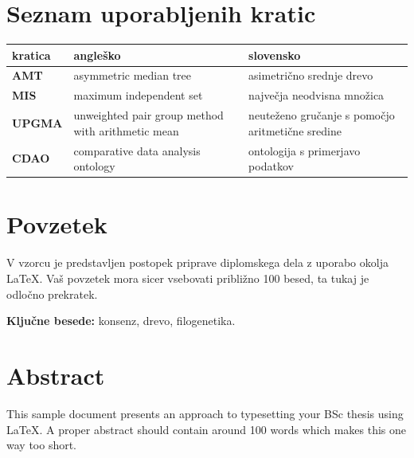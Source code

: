 \documentclass[a4paper, 12pt]{book}
\newcommand{\tkeywords}{konsenz, drevo, filogenetika}
\newcommand{\clearemptydoublepage}{\newpage{\pagestyle{empty}\cleardoublepage}}
\begin{document}
\clearemptydoublepage

\def\thepage{}%
\setcounter{tocdepth}{3}
\tableofcontents{}


\clearemptydoublepage


\chapter*{Seznam uporabljenih kratic}

\begin{tabular}{l|p{6cm}|p{6cm}}
  {\bf kratica} & {\bf angleško} & {\bf slovensko} \\ \hline
  {\bf AMT} & asymmetric median tree & asimetrično srednje drevo \\
  {\bf MIS} & maximum independent set & največja neodvisna množica \\
  {\bf UPGMA} & unweighted pair group method with arithmetic mean & neuteženo gručanje s pomočjo aritmetične sredine \\
  {\bf CDAO} & comparative data analysis ontology  & ontologija s primerjavo podatkov \\
\end{tabular}



\clearemptydoublepage

\chapter*{Povzetek}
V vzorcu je predstavljen postopek priprave diplomskega dela z uporabo okolja \LaTeX. Vaš povzetek mora sicer vsebovati približno 100 besed, ta tukaj je odločno prekratek.
\bigskip

\noindent\textbf{Ključne besede:} \tkeywords.
\clearemptydoublepage

\chapter*{Abstract}
This sample document presents an approach to typesetting your BSc thesis using \LaTeX. A proper abstract should contain around 100 words which makes this one way too short.
\bigskip
\end{document}
